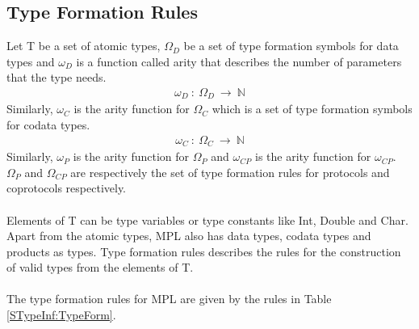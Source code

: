 \documentclass[11pt]{article}
\begin{document}
\subsection {Type Formation Rules}
Let T be a set of atomic types, $\Omega_{D}$ be a set of type formation symbols for data types and $\omega_{D}$ is a function called arity that describes the number of parameters that the type needs.
\begin{align*}
    \omega_{D} ~ : ~ \Omega_{D} ~ \to ~ \mathbb {N}  
\end{align*}
Similarly, $\omega_{C}$ is the arity function for $\Omega_{C}$ which is a set of type formation symbols for codata types.
\begin{align*}
    \omega_{C} ~ : ~ \Omega_{C} ~ \to ~ \mathbb {N}  
\end{align*}
Similarly, $\omega_{P}$ is the arity function for $\Omega_{P}$  and $\omega_{CP}$ is the arity function for $\omega_{CP}$. $\Omega_{P}$ and $\Omega_{CP}$ are respectively the set of type formation rules for protocols and coprotocols respectively.
~~\\~~\\ 
Elements of T can be type variables or type constants like Int, Double and Char. Apart from the atomic types, MPL also has data types, codata types and products as types. Type formation rules describes the rules for the construction of valid types from the elements of T.
~~\\~~\\ 
The type formation rules for MPL are given by the rules in Table \ref {STypeInf:TypeForm}.  
\end{document}
